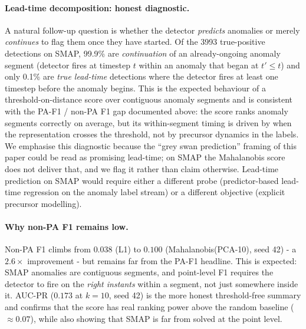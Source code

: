 \documentclass{article}
\begin{document}
\paragraph{Lead-time decomposition: honest diagnostic.} A natural follow-up question is whether the detector \emph{predicts} anomalies or merely \emph{continues} to flag them once they have started. Of the 3993 true-positive detections on SMAP, 99.9\% are \emph{continuation} of an already-ongoing anomaly segment (detector fires at timestep $t$ within an anomaly that began at $t' \leq t$) and only 0.1\% are \emph{true lead-time} detections where the detector fires at least one timestep before the anomaly begins. This is the expected behaviour of a threshold-on-distance score over contiguous anomaly segments and is consistent with the PA-F1 / non-PA F1 gap documented above: the score ranks anomaly segments correctly on average, but its within-segment timing is driven by when the representation crosses the threshold, not by precursor dynamics in the labels. We emphasise this diagnostic because the ``grey swan prediction'' framing of this paper could be read as promising lead-time; on SMAP the Mahalanobis score does not deliver that, and we flag it rather than claim otherwise. Lead-time prediction on SMAP would require either a different probe (predictor-based lead-time regression on the anomaly label stream) or a different objective (explicit precursor modelling).

\paragraph{Why non-PA F1 remains low.} Non-PA F1 climbs from $0.038$ (L1) to $0.100$ (Mahalanobis(PCA-10), seed 42) - a $2.6\times$ improvement - but remains far from the PA-F1 headline. This is expected: SMAP anomalies are contiguous segments, and point-level F1 requires the detector to fire on the \emph{right instants} within a segment, not just somewhere inside it. AUC-PR ($0.173$ at $k=10$, seed 42) is the more honest threshold-free summary and confirms that the score has real ranking power above the random baseline ($\approx 0.07$), while also showing that SMAP is far from solved at the point level.
\end{document}
